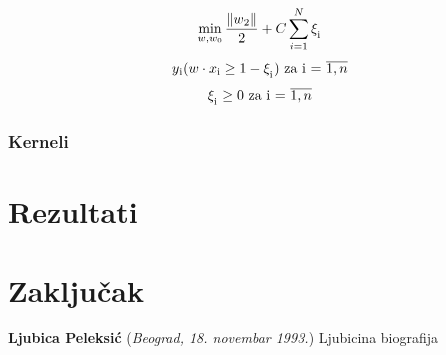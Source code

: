 \documentclass[12pt,oneside]{memoir}
\begin{document}
\begin{equation}
	\min_{w,w_0} \frac{\|w\textsubscript{2}\|}{2} + C \sum_{i=1}^{N} \xi_\textsubscript{i} \notag\\
\end{equation}
\begin{equation}
	y\textsubscript{i}(w \cdot x\textsubscript{i} \geq 1 - \xi_\textsubscript{i}) \text{ za i = } \overline{1,n} \notag\\
\end{equation}
\begin{equation}
	\xi_\textsubscript{i} \geq 0 \text{ za i = } \overline{1,n}
\end{equation}

\subsection{Kerneli}



\chapter{Rezultati}



\chapter{Zaključak}





% 





\backmatter


\begin{biografija}
  \textbf{Ljubica Peleksić} (\emph{Beograd,
    18.  novembar 1993.}) 
	Ljubicina biografija
\end{biografija}
\end{document}
